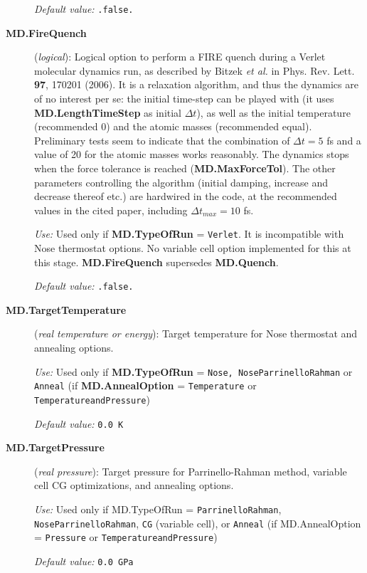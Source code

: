 \documentclass[11pt]{article}
\begin{document}
\begin{description}
{\it Default value:} {\tt .false.}

\item[{\bf MD.FireQuench}] ({\it logical}): 
Logical option to perform a FIRE quench during a Verlet molecular dynamics
run, as described by Bitzek {\it et al.} in Phys. Rev. Lett. {\bf 97},
170201 (2006). It is a relaxation algorithm, and thus the dynamics
are of no interest per se: the initial time-step can be played with
(it uses {\bf MD.LengthTimeStep} as initial $\Delta t$),
as well as the initial temperature (recommended 0) and the atomic
masses (recommended equal). Preliminary tests seem to indicate that 
the combination of $\Delta t = 5$ fs and a value of 20 for the atomic 
masses works reasonably. The dynamics stops when the force
tolerance is reached ({\bf MD.MaxForceTol}). The other
parameters controlling the algorithm (initial damping, 
increase and decrease thereof etc.) are hardwired in the code,
at the recommended values in the cited paper,
including $\Delta t_{max} = 10$ fs.

{\it Use:} Used only if {\bf MD.TypeOfRun} = {\tt Verlet}. 
It is incompatible with Nose thermostat options. No variable
cell option implemented for this at this stage.
{\bf MD.FireQuench} supersedes {\bf MD.Quench}.

{\it Default value:} {\tt .false.}

\item[{\bf MD.TargetTemperature}] ({\it real temperature or energy}): 
Target temperature for Nose thermostat and annealing options.

{\it Use:} Used only if {\bf MD.TypeOfRun} = {\tt Nose, NoseParrinelloRahman}
or {\tt Anneal} (if {\bf MD.AnnealOption} = {\tt Temperature} or 
{\tt TemperatureandPressure})

{\it Default value:} {\tt 0.0 K}

\item[{\bf MD.TargetPressure}] ({\it real pressure}): 
Target pressure for Parrinello-Rahman method, variable cell CG optimizations,
and annealing options.

{\it Use:} Used only if MD.TypeOfRun = 
{\tt ParrinelloRahman}, {\tt NoseParrinelloRahman},
{\tt CG} (variable cell), or {\tt Anneal} 
(if MD.AnnealOption = {\tt Pressure} or {\tt TemperatureandPressure})

{\it Default value:} {\tt 0.0 GPa}



\end{description}
\end{document}

